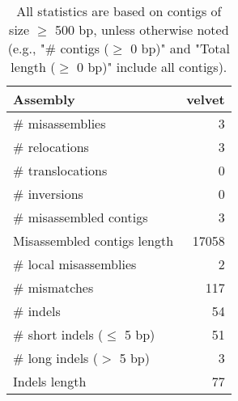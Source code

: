 \documentclass[12pt,a4paper]{article}
\begin{document}
\begin{table}[ht]
\begin{center}
\caption{All statistics are based on contigs of size $\geq$ 500 bp, unless otherwise noted (e.g., "\# contigs ($\geq$ 0 bp)" and "Total length ($\geq$ 0 bp)" include all contigs).}
\begin{tabular}{|l*{1}{|r}|}
\hline
Assembly & velvet \\ \hline
\# misassemblies & 3 \\ \hline
\hspace{5mm}\# relocations & 3 \\ \hline
\hspace{5mm}\# translocations & 0 \\ \hline
\hspace{5mm}\# inversions & 0 \\ \hline
\# misassembled contigs & 3 \\ \hline
Misassembled contigs length & 17058 \\ \hline
\# local misassemblies & 2 \\ \hline
\# mismatches & 117 \\ \hline
\# indels & 54 \\ \hline
\hspace{5mm}\# short indels ($\leq$ 5 bp) & 51 \\ \hline
\hspace{5mm}\# long indels ($>$ 5 bp) & 3 \\ \hline
Indels length & 77 \\ \hline
\end{tabular}
\end{center}
\end{table}
\end{document}
